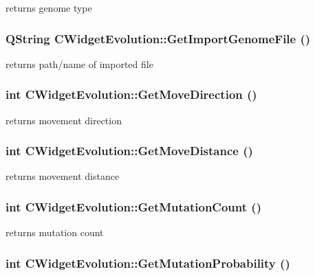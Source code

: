 returns genome type \hypertarget{classCWidgetEvolution_a29e080891a238ae764150e625151d132}{
\subsubsection[{GetImportGenomeFile}]{\setlength{\rightskip}{0pt plus 5cm}QString CWidgetEvolution::GetImportGenomeFile ()}}
\label{classCWidgetEvolution_a29e080891a238ae764150e625151d132}
returns path/name of imported file \hypertarget{classCWidgetEvolution_a93068c5f3e07a982485cd7a12647905f}{
\subsubsection[{GetMoveDirection}]{\setlength{\rightskip}{0pt plus 5cm}int CWidgetEvolution::GetMoveDirection ()}}
\label{classCWidgetEvolution_a93068c5f3e07a982485cd7a12647905f}
returns movement direction \hypertarget{classCWidgetEvolution_abc656941aa35fbed538c057939bd6126}{
\subsubsection[{GetMoveDistance}]{\setlength{\rightskip}{0pt plus 5cm}int CWidgetEvolution::GetMoveDistance ()}}
\label{classCWidgetEvolution_abc656941aa35fbed538c057939bd6126}
returns movement distance \hypertarget{classCWidgetEvolution_a678de75bb460f47bd264e8f7204239dc}{
\subsubsection[{GetMutationCount}]{\setlength{\rightskip}{0pt plus 5cm}int CWidgetEvolution::GetMutationCount ()}}
\label{classCWidgetEvolution_a678de75bb460f47bd264e8f7204239dc}
returns mutation count \hypertarget{classCWidgetEvolution_a5880bb761b37c1cdf3e9bed2def2a88b}{
\subsubsection[{GetMutationProbability}]{\setlength{\rightskip}{0pt plus 5cm}int CWidgetEvolution::GetMutationProbability ()}}
